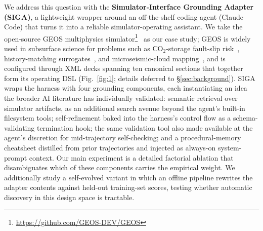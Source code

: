 \documentclass{article}
\begin{document}
We address this question with the \textbf{Simulator-Interface Grounding Adapter (SIGA)}, a lightweight wrapper around an off-the-shelf coding agent (Claude Code) that turns it into a reliable simulator-operating assistant. We take the open-source GEOS multiphysics simulator\footnote{\url{https://github.com/GEOS-DEV/GEOS}}~\citep{geos2024} as our case study; GEOS is widely used in subsurface science for problems such as CO$_2$-storage fault-slip risk~\citep{he2026faultslip}, history-matching surrogates~\citep{han2024accelerated}, and microseismic-cloud mapping~\citep{glubokovskikh2023microseismic}, and is configured through XML decks spanning ten canonical sections that together form its operating DSL (Fig.~\ref{fig:1}; details deferred to \S\ref{sec:background}). SIGA wraps the harness with four grounding components, each instantiating an idea the broader AI literature has individually validated: semantic retrieval over simulator artifacts, as an additional search avenue beyond the agent's built-in filesystem tools; self-refinement baked into the harness's control flow as a schema-validating termination hook; the same validation tool also made available at the agent's discretion for mid-trajectory self-checking; and a procedural-memory cheatsheet distilled from prior trajectories and injected as always-on system-prompt context. Our main experiment is a detailed factorial ablation that disambiguates which of these components carries the empirical weight. We additionally study a self-evolved variant in which an offline pipeline rewrites the adapter contents against held-out training-set scores, testing whether automatic discovery in this design space is tractable.
\end{document}
